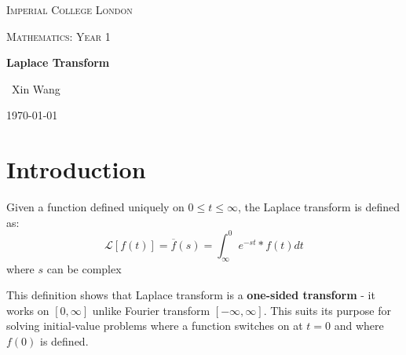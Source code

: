 \documentclass[10pt,a4paper]{article}
\begin{document}
\begin{titlepage}
	\centering
	{\scshape\LARGE Imperial College London \par}
	\vspace{1cm}
	{\scshape\Large Mathematics: Year 1\par}
	\vspace{1.5cm}
	{\huge\bfseries Laplace Transform\par}
	\vspace{2cm}
	{\Large\ Xin Wang }
	\vfill
	{\large \today\par}
\end{titlepage}

\begin{abstract}
Laplace Transform methods play a important role Analysis and Design of engineering systems. Laplace
Transform is concerned with the systematic solution of ordinary differential equations with constant
coefficients.\par 
Mathematical transformations are
used to simplify solutions of problems by creating a new domain in which it is easier to handle the
problem. The results are then inverse-transformed to give the desired results in the original
domain. \par 
Laplace Transform is an example of \textbf{Integral Transforms} like Fourier Transforms. Laplace
Transforms turn \textit{differential equations} in time domain $t$ to \textit{algebraic equations} in
complex frequency domain $s$. Initial Conditions are essential in Laplace Transforms, making it
perfect for solving initial-value problems e.g. electrical circuits and mechanical vibrations.
\end{abstract}

\tableofcontents
\pagebreak

\section{Introduction}
Given a function defined uniquely on $0\leq t \leq \infty$, the Laplace transform is defined as: 
$$\mathcal{L}[f(t)]=\overline{f}(s)=\int_{\infty}^{0}e^{-st}*f(t)dt$$ where $s$ can be complex \par 
This definition shows that Laplace transform is a \textbf{one-sided transform} - it works on
$[0,\infty]$ unlike Fourier transform $[-\infty,\infty]$. This suits its purpose for solving
initial-value problems where a function switches on at $t=0$ and where $f(0)$ is defined. \par 
\end{document}
